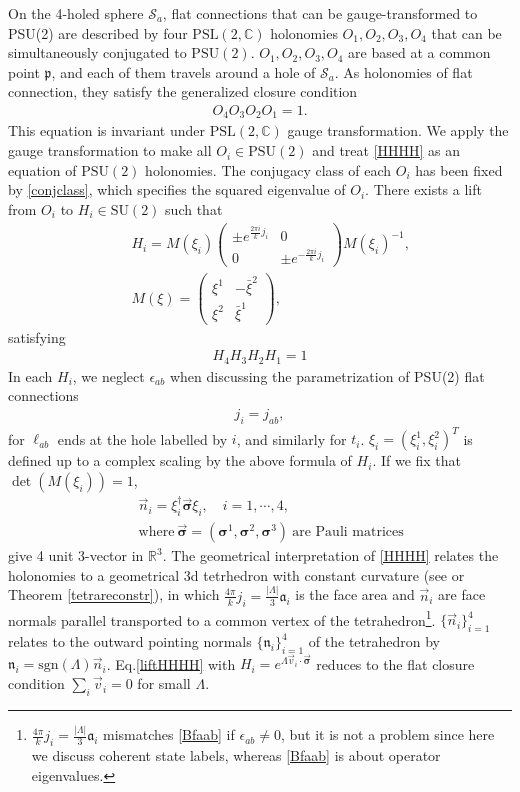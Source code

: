 \documentclass[aps,prd,notitlepage,nofootinbib,superscriptaddress,groupedaddress,twocolumn]{revtex4-1}
\def\R{\mathbb{R}}
\def\sgn{\text{sgn}}
\newcommand{\PSlc}{\mathrm{PSL}(2,\mathbb{C})}
\newcommand{\Su}{\mathrm{SU}(2)}
\newcommand{\PSu}{\mathrm{PSU}(2)}
\def\be{\begin{eqnarray}}
\def\ee{\end{eqnarray}}
\newcommand{\cs}{\mathcal S}
\newcommand{\fa}{\mathfrak{a}}  \newcommand{\Fa}{\mathfrak{A}}
\newcommand{\fn}{\mathfrak{n}}  \newcommand{\Fn}{\mathfrak{N}}
\newcommand{\fp}{\mathfrak{p}}  \newcommand{\Fp}{\mathfrak{P}}
\newcommand{\sig}{\sigma}
\renewcommand{\L }{\Lambda}
\begin{document}
On the 4-holed sphere $\cs_a$, flat connections that can be gauge-transformed to PSU(2) are described by four $\PSlc$ 
holonomies $O_1,O_2,O_3,O_4$ that can be simultaneously conjugated to $\PSu$. $O_1,O_2,O_3,O_4$ are based at a common point $\fp$, and each of them travels around a hole of $\cs_a$. As holonomies of flat connection, they satisfy the generalized closure condition
\be
O_4O_3O_2O_1=1.\label{HHHH}
\ee
This equation is invariant under $\PSlc$ gauge transformation. We apply the gauge transformation to make all $O_i\in\PSu$ and treat \eqref{HHHH} as an equation of $\PSu$ holonomies. The conjugacy class of each $O_i$ has been fixed by \eqref{conjclass}, which specifies the squared eigenvalue of $O_i$. There exists a lift from $O_i$ to $H_i\in\Su$ such that 
\be
&&H_i= M(\xi_i)\left(\begin{array}{cc}
	  \pm e^{\frac{2\pi i}{k}j_i} & 0 \\
	0 & \pm e^{-\frac{2\pi i}{k}j_i}
	\end{array}\right)M(\xi_i)^{-1},\label{Hi}\\
&&M(\xi)=\left(\begin{array}{cc}
		\xi^1 & -\bar{\xi}^2 \\
	  \xi^2 & \bar{\xi}^1
	  \end{array}\right),
\ee
satisfying 
\be
H_4H_3H_2H_1=1\label{liftHHHH}
\ee
In each $H_i$, we neglect $\epsilon_{ab}$ when discussing the parametrization of PSU(2) flat connections
\be
j_i=j_{ab},\nonumber%
\ee 
for $\ell_{ab}$ ends at the hole labelled by $i$, and similarly for $t_i$. $\xi_i=(\xi_i^1,\xi_i^2)^T$ is defined up to a complex scaling by the above formula of $H_i$. If we fix that $\det(M(\xi_i))=1$, 
\be
&&\vec{n}_i=\xi_i^\dagger\vec{\bm{\sig}}\xi_i,\quad i=1,\cdots,4,\\
&&\text{where}\ \vec{\bm{\sig}}=(\bm{\sig}^1,\bm{\sig}^2,\bm{\sig}^3)\ \text{are Pauli matrices}\nonumber
\ee
give 4 unit 3-vector in $\R^3$. The geometrical interpretation of \eqref{HHHH} relates the holonomies to a geometrical 3d tetrhedron with constant curvature (see \cite{curvedMink,HHKR} or Theorem \ref{tetrareconstr}), in which $\frac{4\pi}{k}j_i=\frac{|\L|}{3}\fa_i$ is the face area and $\vec{n}_i$ are face normals parallel transported to a common vertex of the tetrahedron\footnote{$\frac{4\pi}{k}j_i=\frac{|\L|}{3}\fa_i$ mismatches \eqref{Bfaab} if $\epsilon_{ab}\neq 0$, but it is not a problem since here we discuss coherent state labels, whereas \eqref{Bfaab} is about operator eigenvalues.}. $\{\vec{n}_i\}_{i=1}^4$ relates to the outward pointing normals $\{\fn_i\}_{i=1}^4$ of the tetrahedron by $\fn_i=\sgn(\L)\vec{n}_i$. Eq.\eqref{liftHHHH} with $H_i=e^{\L \vec{v}_i\cdot \vec{\bm{\sig}}}$ reduces to the flat closure condition $\sum_i\vec{v}_i=0$ for small $\L$. %
\end{document}
